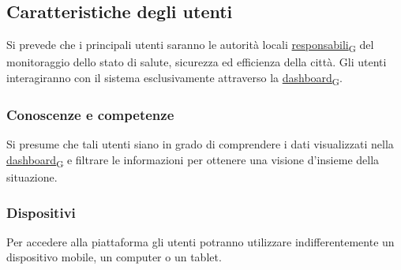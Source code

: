 \subsection{Caratteristiche degli utenti}
Si prevede che i principali utenti saranno le autorità locali \href{https://7last.github.io/docs/pb/documentazione-interna/glossario\#responsabile}{responsabili\textsubscript{G}} del monitoraggio dello stato di salute, sicurezza ed efficienza della città. Gli utenti interagiranno con il sistema esclusivamente attraverso la \href{https://7last.github.io/docs/pb/documentazione-interna/glossario\#dashboard}{dashboard\textsubscript{G}}.

\subsubsection{Conoscenze e competenze}
Si presume che tali utenti siano in grado di comprendere i dati visualizzati nella \href{https://7last.github.io/docs/pb/documentazione-interna/glossario\#dashboard}{dashboard\textsubscript{G}} e filtrare le informazioni per ottenere una visione d’insieme della situazione.

\subsubsection{Dispositivi}
Per accedere alla piattaforma gli utenti potranno utilizzare indifferentemente un dispositivo mobile, un computer o un tablet.